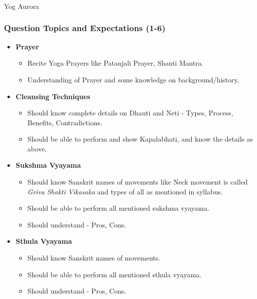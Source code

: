 \begin{frame}[fragile]\frametitle{}
\begin{center}
{\Large Yog Aurora}
\end{center}
\end{frame}

\begin{frame}[fragile]\frametitle{Question Topics and Expectations (1-6)}
    \begin{itemize}
        \item \textbf{Prayer}
        \begin{itemize}
            \item Recite Yoga Prayers like Patanjali Prayer, Shanti Mantra.
            \item Understanding of Prayer and some knowledge on background/history.
        \end{itemize}
        \item \textbf{Cleansing Techniques}
        \begin{itemize}
            \item Should know complete details on Dhauti and Neti - Types, Process, Benefits, Contradictions.
            \item Should be able to perform and show Kapalabhati, and know the details as above.
        \end{itemize}
        \item \textbf{Sukshma Vyayama}
        \begin{itemize}
            \item Should know Sanskrit names of movements like Neck movement is called \textit{Griva Shakti Vikasaka} and types of all as mentioned in syllabus.
            \item Should be able to perform all mentioned sukshma vyayama.
            \item Should understand - Pros, Cons.
        \end{itemize}
        \item \textbf{Sthula Vyayama}
        \begin{itemize}
            \item Should know Sanskrit names of movements.
            \item Should be able to perform all mentioned sthula vyayama.
            \item Should understand - Pros, Cons.

\end{itemize}
\end{itemize}
\end{frame}
